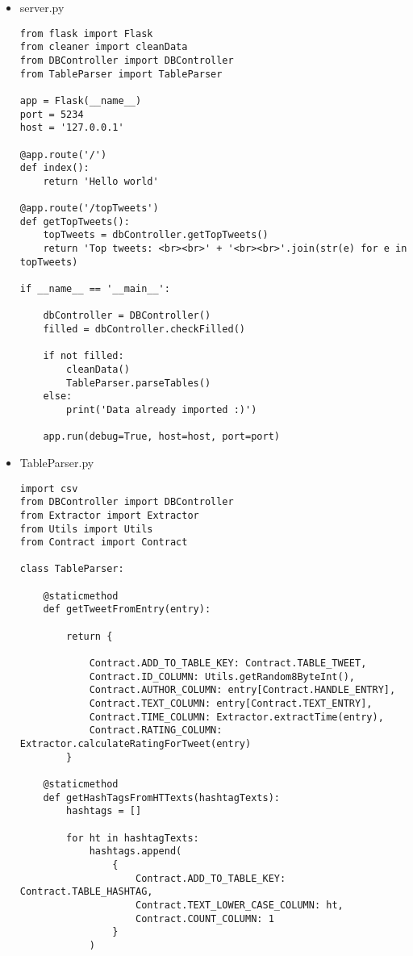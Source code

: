 \begin{itemize}

\item server.py \\

\begin{lstlisting}[style=py]
from flask import Flask
from cleaner import cleanData
from DBController import DBController
from TableParser import TableParser

app = Flask(__name__)
port = 5234
host = '127.0.0.1'

@app.route('/')
def index():
	return 'Hello world'

@app.route('/topTweets')
def getTopTweets():
	topTweets = dbController.getTopTweets()
	return 'Top tweets: <br><br>' + '<br><br>'.join(str(e) for e in topTweets)

if __name__ == '__main__':

	dbController = DBController()
	filled = dbController.checkFilled()

	if not filled:
		cleanData()
		TableParser.parseTables()
	else:
		print('Data already imported :)')

	app.run(debug=True, host=host, port=port)
\end{lstlisting}

\item TableParser.py \\

\begin{lstlisting}[style=py]
import csv
from DBController import DBController
from Extractor import Extractor
from Utils import Utils
from Contract import Contract

class TableParser:

	@staticmethod
	def getTweetFromEntry(entry):

		return {

			Contract.ADD_TO_TABLE_KEY: Contract.TABLE_TWEET,
			Contract.ID_COLUMN: Utils.getRandom8ByteInt(),
			Contract.AUTHOR_COLUMN: entry[Contract.HANDLE_ENTRY],
			Contract.TEXT_COLUMN: entry[Contract.TEXT_ENTRY],
			Contract.TIME_COLUMN: Extractor.extractTime(entry),
			Contract.RATING_COLUMN: Extractor.calculateRatingForTweet(entry)  
		}

	@staticmethod	
	def getHashTagsFromHTTexts(hashtagTexts):
		hashtags = []

		for ht in hashtagTexts:
			hashtags.append(
				{
					Contract.ADD_TO_TABLE_KEY: Contract.TABLE_HASHTAG,
					Contract.TEXT_LOWER_CASE_COLUMN: ht,
					Contract.COUNT_COLUMN: 1
				}
			)
		

\end{lstlisting}
\end{itemize}
